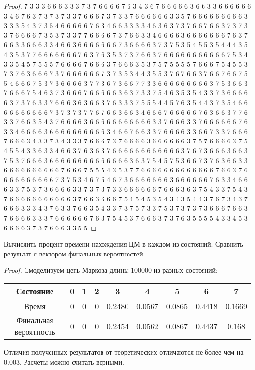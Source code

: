 \begin{proof}
	7 3 3 3 6 6 6 3 3 3 7 3 7 6 6 6 6 7 6 3 4 3 6 7 6 6 6 6 6 3 6 6 3 3 6 6 6 6 6 6 3 4 6 7 6 3 7 3 7 3 7 3 3 7 6 6 6 7 3 7 3 3 7 6 6 6 6 6 6 3 3 5 7 6 6 6 6 6 6 6 6 6 3 3 3 3 5 4 3 7 3 5 4 6 6 6 6 6 7 6 3 4 6 6 3 3 3 3 4 6 3 6 3 7 3 7 6 6 7 6 6 3 7 3 7 3 3 7 6 6 6 6 7 3 5 3 7 3 3 7 7 6 6 6 6 7 3 7 6 6 3 3 4 6 6 6 6 3 6 6 6 6 6 6 6 7 6 3 7 6 6 3 3 6 6 6 3 3 4 6 6 3 6 6 6 6 6 6 6 7 3 6 6 6 6 3 7 3 7 5 3 5 4 5 5 3 5 4 4 4 3 5 4 3 5 3 7 7 6 6 6 6 6 6 6 7 6 3 7 6 3 5 3 7 3 7 6 6 3 7 6 6 6 6 6 6 6 6 6 6 6 7 5 3 4 3 3 5 4 5 7 5 5 5 7 6 6 6 6 7 6 6 6 3 7 6 6 6 3 5 3 7 5 7 5 5 5 5 7 6 6 6 7 5 4 5 5 3 7 3 7 6 3 6 6 6 7 3 7 6 6 6 6 6 6 7 3 7 3 5 3 4 4 3 5 5 3 7 6 7 6 6 3 7 6 6 7 6 6 7 5 5 4 6 6 6 7 5 3 7 3 6 6 6 6 3 7 7 3 6 7 3 6 6 7 7 3 3 6 6 6 6 6 6 6 6 6 3 7 5 3 6 6 3 7 6 6 6 7 5 4 6 3 7 3 6 6 6 7 6 6 6 6 6 3 6 3 7 3 3 7 5 4 6 3 5 3 5 4 3 3 7 3 6 6 6 6 6 3 7 3 7 6 3 3 7 6 6 6 3 6 3 6 6 3 7 6 3 3 3 7 5 5 5 4 4 5 7 6 3 5 4 4 3 7 3 5 4 6 6 6 6 6 6 6 6 6 6 7 3 7 3 7 3 7 7 6 7 6 6 3 6 6 3 4 6 6 6 7 6 6 6 6 6 7 6 3 6 6 3 7 7 6 3 3 7 6 6 3 5 4 3 7 6 6 6 6 3 6 6 6 6 6 6 6 6 6 6 6 3 3 7 6 6 6 3 3 7 6 6 6 6 6 6 7 6 3 3 4 6 6 6 6 3 6 6 6 6 6 6 6 6 6 6 3 4 6 6 7 6 6 3 3 7 6 6 6 6 3 3 6 6 7 3 3 7 6 6 6 7 6 6 6 3 4 3 3 7 3 4 3 3 3 7 6 6 6 7 3 7 6 6 6 6 3 6 6 6 6 6 6 3 7 5 7 6 6 6 6 3 7 5 4 5 5 4 3 3 6 3 3 4 6 6 3 7 6 3 6 3 7 6 6 6 6 6 6 6 6 6 6 6 6 3 7 6 7 3 6 6 6 3 6 6 3 7 5 3 7 6 6 6 3 6 6 6 6 6 6 6 6 6 6 6 6 6 6 3 6 3 7 5 4 5 7 5 3 6 6 7 3 7 6 3 6 6 3 3 6 6 6 6 6 6 6 6 6 6 7 6 6 6 7 5 5 5 4 3 5 3 7 7 6 6 6 6 6 6 6 6 6 6 6 6 6 7 6 6 3 7 6 6 6 6 6 6 6 6 6 6 7 3 7 5 3 4 6 7 5 4 6 7 3 6 6 6 6 6 6 6 3 6 6 6 6 6 6 7 6 3 3 4 6 6 6 3 3 7 5 3 7 3 6 6 6 6 3 3 7 3 7 3 7 3 3 6 6 6 6 6 6 7 6 6 6 3 6 3 7 5 4 3 3 7 5 4 3 7 6 6 6 6 6 6 6 6 6 6 6 3 7 6 6 3 6 6 6 7 5 4 5 4 5 3 5 4 3 4 3 5 4 4 3 7 6 7 3 4 3 7 6 6 6 3 3 3 4 3 7 6 3 3 7 6 6 3 5 4 3 3 7 3 7 5 7 3 3 7 5 3 7 3 7 3 7 3 6 6 6 7 6 6 3 7 6 6 6 6 3 3 3 7 6 6 6 6 6 6 7 6 3 7 5 4 5 3 7 6 6 6 3 7 3 7 6 3 5 5 5 5 4 3 3 4 5 3 6 6 6 6 3 7 3 7 6 6 6 3 3 5 5 
\end{proof}

\begin{problem}
	Вычислить процент времени нахождения ЦМ в каждом из состояний. Сравнить результат с вектором финальных вероятностей.
\end{problem}

\begin{proof}
	Смоделируем цепь Маркова длины 100000 из разных состояний:
	\begin{center}
		\begin{tabular}{|c||c|c|c|c|c|c|c|c|}
			\hline
			Состояние & 0 & 1 & 2 & 3 & 4 & 5 & 6 & 7 \\
			\hline
			Время & 0 & 0 & 0 & 0.2480 & 0.0567 & 0.0865 & 0.4418 & 0.1669 \\
			\hline
			Финальная вероятность & 0 & 0 & 0 & 0.2454 & 0.0562 & 0.0867 & 0.4437 & 0.168\\
			\hline
		\end{tabular}
	\end{center}
	Отличия полученных результатов от теоретических отличаются не более чем на 0.003. Расчеты можно считать верными.
\end{proof}